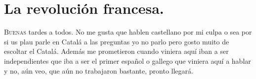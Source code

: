 \chapter{La revolución francesa.}


\lettrine[lines=2, findent=3pt, nindent=0pt]{B}{uenas} tardes a todos. No me gusta que hablen castellano por mi culpa o sea por si us plau parle en Catalá a las preguntas yo no parlo pero gosto muito de escoltar el Catalá. Además me prometieron cuando viniera aquí iban a ser independientes que iba a ser el primer español o gallego que viniera aquí a hablar y no, aún veo, que aún no trabajaron bastante, pronto llegará.

